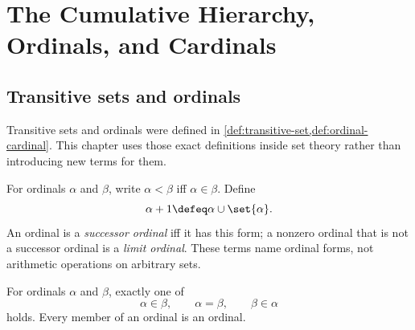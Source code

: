 \chapter[Hierarchy, Ordinals, and Cardinals]{The Cumulative Hierarchy, Ordinals, and Cardinals}
\label{ch:cumulative-hierarchy}

\section{Transitive sets and ordinals}
\label{sec:cumulative-hierarchy-01}

Transitive sets and ordinals were defined in
\cref{def:transitive-set,def:ordinal-cardinal}.  This chapter uses those exact
definitions inside set theory rather than introducing new terms for them.

For ordinals \(\alpha\) and \(\beta\), write \(\alpha<\beta\) iff
\(\alpha\in\beta\).  Define
\[
  \alpha+1\defeq\alpha\cup\set{\alpha}.
\]
An ordinal is a \emph{successor ordinal} iff it has this form; a nonzero ordinal
that is not a successor ordinal is a \emph{limit ordinal}.  These terms name
ordinal forms, not arithmetic operations on arbitrary sets.

\begin{theorem}
For ordinals \(\alpha\) and \(\beta\), exactly one of
\[
  \alpha\in\beta,\qquad \alpha=\beta,\qquad \beta\in\alpha
\]
holds.  Every member of an ordinal is an ordinal.
\end{theorem}

